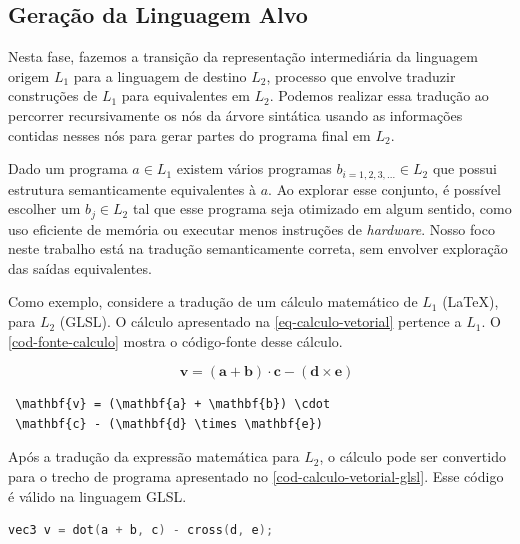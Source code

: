 \documentclass[english, 
               brazil, 
               bsc] %
               {dcomp-abntex2}
\begin{document}
\subsection{Geração da Linguagem Alvo} \label{codegen}


Nesta fase, fazemos a transição da representação intermediária  da linguagem origem \( L_1 \)  para  a linguagem de destino \( L_2 \), processo que envolve traduzir construções de \( L_1 \) para equivalentes em $L_2$. Podemos realizar essa tradução ao percorrer recursivamente os nós da árvore sintática usando as informações contidas nesses nós para gerar partes do programa final em $L_2$.


Dado um programa $a \in L_1$ existem vários programas $b_{i=1,2,3,...} \in L_2$ que possui estrutura semanticamente equivalentes à $a$. Ao explorar esse conjunto, é possível escolher um $b_j \in L_2$ tal que esse programa seja otimizado em algum sentido, como uso eficiente de memória ou executar menos instruções de \textit{hardware}. Nosso foco neste trabalho está na tradução semanticamente correta, sem envolver exploração das saídas  equivalentes.


Como exemplo, considere a tradução de um cálculo matemático de \( L_1 \) (\LaTeX), para \( L_2 \) (GLSL). O cálculo apresentado na \autoref{eq-calculo-vetorial} pertence a $L_1$. O \autoref{cod-fonte-calculo} mostra o código-fonte desse cálculo. 




\begin{equation} \label{eq-calculo-vetorial}
 \quad \mathbf{v} = (\mathbf{a} + \mathbf{b}) \cdot
 \mathbf{c} - (\mathbf{d} \times \mathbf{e})
\end{equation}


\begin{codigo}
\caption{\small Cálculo vetorial em código-fonte \LaTeX.}
  \label{cod-fonte-calculo}
\begin{lstlisting}
 \mathbf{v} = (\mathbf{a} + \mathbf{b}) \cdot
 \mathbf{c} - (\mathbf{d} \times \mathbf{e})
\end{lstlisting}
\end{codigo}






Após a tradução da expressão matemática para \( L_2 \), o cálculo pode ser convertido para o trecho de programa apresentado no \autoref{cod-calculo-vetorial-glsl}. Esse código é válido na linguagem GLSL.


\begin{codigo}
\caption{\small Cálculo vetorial em código GLSL.}
\label{cod-calculo-vetorial-glsl}
\begin{lstlisting}[language = C]
    vec3 v = dot(a + b, c) - cross(d, e);
\end{lstlisting}
\end{codigo}
\end{document}
